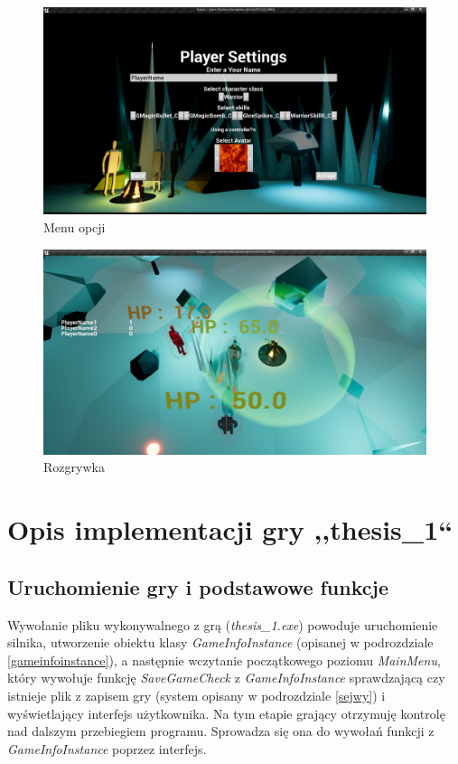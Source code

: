 \documentclass[multip]{SGGW-thesis}
\begin{document}
\begin{figure}
	\centering
		\includegraphics[width=1\textwidth]{figures/settingsmenu.jpg}
	\caption{Menu opcji}
	\label{settingsmenu}
\end{figure}
\begin{figure}
	\centering
		\includegraphics[width=1\textwidth]{figures/gameplay1.jpg}
	\caption{Rozgrywka}
	\label{gameplay1}
\end{figure}
\chapter{Opis implementacji gry ,,thesis\_1``}
\label{implementacja}

\section{Uruchomienie gry i podstawowe funkcje}
Wywołanie pliku wykonywalnego z grą ({\em thesis\_1.exe}) powoduje uruchomienie silnika, utworzenie obiektu klasy {\em GameInfoInstance} (opisanej w podrozdziale \ref{gameinfoinstance}), a następnie wczytanie początkowego poziomu {\em MainMenu}, który wywołuje funkcję {\em SaveGameCheck} z {\em GameInfoInstance} sprawdzającą czy istnieje plik z zapisem gry (system opisany w podrozdziale \ref{sejwy}) i wyświetlający interfejs użytkownika. Na tym etapie grający otrzymuję kontrolę nad dalszym przebiegiem programu. Sprowadza się ona do wywołań funkcji z {\em GameInfoInstance} poprzez interfejs.
\end{document}

